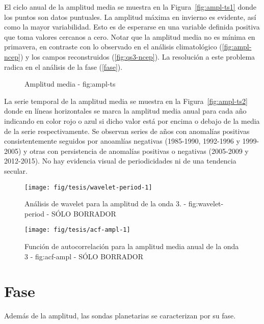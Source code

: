 \documentclass[spanish,a4paper]{book}
\begin{document}
El ciclo anual de la amplitud media se muestra en la
Figura~\ref{fig:ampl-ts1} donde los puntos son datos puntuales. La
amplitud máxima en invierno es evidente, así como la mayor variabilidad.
Esto es de esperarse en una variable definida positiva que toma valores
cercanos a cero. Notar que la amplitud media no es mínima en primavera,
en contraste con lo observado en el análisis climatológico
(\autoref{fig:ampl-ncep}) y los campos reconstruidos
(\autoref{fig:qs3-ncep}). La resolución a este problema radica en el
análisis de la fase (\autoref{fase}).

\begin{figure*}
\newline{}\caption{Amplitud media - fig:ampl-ts}\label{fig:ampl-ts}
\end{figure*}

La serie temporal de la amplitud media se muestra en la
Figura~\ref{fig:ampl-ts2} donde en líneas horizontales se marca la
amplitud media anual para cada año indicando en color rojo o azul si
dicho valor está por encima o debajo de la media de la serie
respectivamente. Se observan series de años con anomalías positivas
consistentemente seguidos por anoamlías negativas (1985-1990, 1992-1996
y 1999-2005) y otras con persistencia de anomalías positivas o negativas
(2005-2009 y 2012-2015). No hay evidencia visual de periodicidades ni de
una tendencia secular.

\begin{figure}
\texttt{[image: fig/tesis/wavelet-period-1]} \caption{Análisis de wavelet para la amplitud de la onda 3. - fig:wavelet-period - SÓLO BORRADOR}\label{fig:wavelet-period}
\end{figure}

\begin{figure}
\texttt{[image: fig/tesis/acf-ampl-1]} \caption{Función de autocorrelación para la amplitud media anual de la onda 3 - fig:acf-ampl - SÓLO BORRADOR}\label{fig:acf-ampl}
\end{figure}

\section{Fase}\label{fase}

Además de la amplitud, las sondas planetarias se caracterizan por su
fase. 
\end{document}
